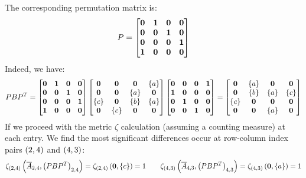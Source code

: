 \documentclass[12pt]{article}
\begin{document}
\begin{example}
  The corresponding permutation matrix is:
  \begin{align*}
    P =
      \begin{bmatrix}
        \mathbf{0} & \mathbf{1} & \mathbf{0} & \mathbf{0} \\
        \mathbf{0} & \mathbf{0} & \mathbf{1} & \mathbf{0} \\
        \mathbf{0} & \mathbf{0} & \mathbf{0} & \mathbf{1} \\
        \mathbf{1} & \mathbf{0} & \mathbf{0} & \mathbf{0}
      \end{bmatrix}
  \end{align*}
  Indeed, we have:
  \begin{align*}
    PB{P}^{T}
    =
      \begin{bmatrix}
        \mathbf{0} & \mathbf{1} & \mathbf{0} & \mathbf{0} \\
        \mathbf{0} & \mathbf{0} & \mathbf{1} & \mathbf{0} \\
        \mathbf{0} & \mathbf{0} & \mathbf{0} & \mathbf{1} \\
        \mathbf{1} & \mathbf{0} & \mathbf{0} & \mathbf{0}
      \end{bmatrix}
      \begin{bmatrix}
        \mathbf{0} & \mathbf{0} & \mathbf{0} & \left\{a\right\} \\
        \mathbf{0} & \mathbf{0} & \left\{a\right\} & \mathbf{0} \\
        \left\{c\right\} & \mathbf{0} & \left\{b\right\} & \left\{a\right\} \\
        \mathbf{0} & \left\{c\right\} & \mathbf{0} & \mathbf{0}
      \end{bmatrix}
      \begin{bmatrix}
        \mathbf{0} & \mathbf{0} & \mathbf{0} & \mathbf{1} \\
        \mathbf{1} & \mathbf{0} & \mathbf{0} & \mathbf{0} \\
        \mathbf{0} & \mathbf{1} & \mathbf{0} & \mathbf{0} \\
        \mathbf{0} & \mathbf{0} & \mathbf{1} & \mathbf{0}
      \end{bmatrix}
    =
      \begin{bmatrix}
        \mathbf{0} & \left\{a\right\} & \mathbf{0} & \mathbf{0} \\
        \mathbf{0} & \left\{b\right\} & \left\{a\right\} & \left\{c\right\} \\
        \left\{c\right\} & \mathbf{0} & \mathbf{0} & \mathbf{0} \\
        \mathbf{0} & \mathbf{0} & \left\{a\right\} & \mathbf{0}
      \end{bmatrix}
  \end{align*}
  If we proceed with the metric \(\zeta\) calculation
  (assuming a counting measure) at each entry.
  We find the most significant differences occur
  at row-column index pairs \(\left(2, 4\right)\) and \(\left(4, 3\right)\):
  \begin{align*}
    \zeta_{\left(2, 4\right)}\left(\overline{A}_{2, 4},
           \left(PB{P}^{T}\right)_{2, 4}\right)
      = \zeta_{\left(2, 4\right)}\left(\mathbf{0}, \left\{c\right\}\right) = 1
    \qquad
    \zeta_{\left(4, 3\right)} \left(\overline{A}_{4, 3},
           \left(PB{P}^{T}\right)_{4, 3}\right)
      = \zeta_{\left(4, 3\right)}\left(\mathbf{0}, \left\{a\right\}\right) = 1
  \end{align*}

\end{example}





\pagebreak

\printbibliography
\end{document}
